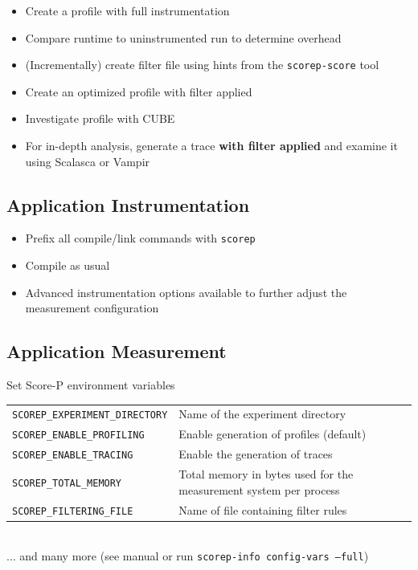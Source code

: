 \begin{itemize}
\itemsep0.1em
\item  Create a profile with full instrumentation
\item  Compare runtime to uninstrumented run to determine overhead
\item  (Incrementally) create filter file using hints from the
      \texttt{scorep-score} tool
\item  Create an optimized profile with filter applied
\item  Investigate profile with CUBE
\item  For in-depth analysis, generate a trace \textbf{with filter applied}
      and examine it using Scalasca or Vampir
\end{itemize}


\subsection{Application Instrumentation}
\begin{itemize}
\itemsep0.1em
\item Prefix all compile/link commands with \texttt{scorep}\\
\item Compile as usual\\
\item Advanced instrumentation options available to further adjust the measurement configuration
\end{itemize}
\subsection{Application Measurement}
Set Score-P environment variables\\[1ex]
\begin{tabular}{@{}l@{ }l@{ }}
\texttt{SCOREP\_EXPERIMENT\_DIRECTORY} & Name of the experiment directory\\
\texttt{SCOREP\_ENABLE\_PROFILING} & Enable generation of profiles (default)\\
\texttt{SCOREP\_ENABLE\_TRACING} & Enable the generation of traces\\
\texttt{SCOREP\_TOTAL\_MEMORY} & Total memory in bytes used for the measurement system per process\\
\texttt{SCOREP\_FILTERING\_FILE} & Name of file containing filter rules\\
\end{tabular}\\[1ex]
... and many more (see manual or run \texttt{scorep-info config-vars ---full})\\

